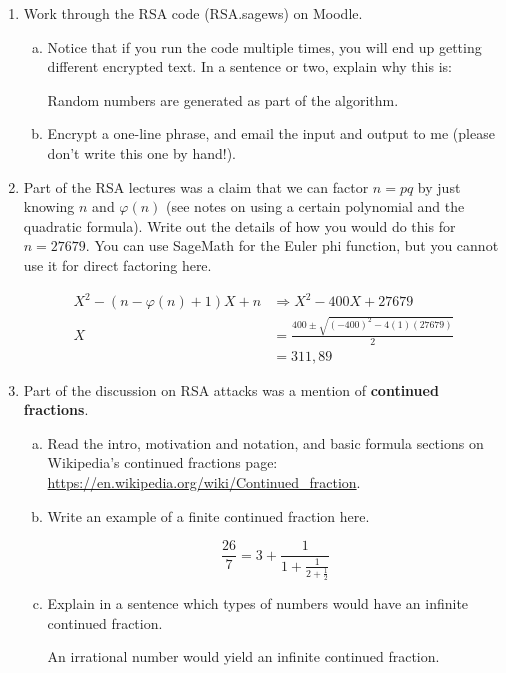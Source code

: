\documentclass[12pt]{amsart}
\theoremstyle{plain}
\theoremstyle{definition}
\begin{document}
\begin{enumerate}[1.]
	\item Work through the RSA code (RSA.sagews) on Moodle.  
	\begin{enumerate}[a.]
		\item Notice that if you run the code multiple times, you will end up getting different encrypted text.  In a sentence or two, explain why this is:
		\begin{framed}
		Random numbers are generated as part of the algorithm.
		\end{framed}
		\item Encrypt a one-line phrase, and email the input and output to me (please don't write this one by hand!).
	\end{enumerate}
	 \item Part of the RSA lectures was a claim that we can factor $n = pq$ by just knowing $n$ and $\varphi(n)$ (see notes on using a certain polynomial and the quadratic formula).  Write out the details of how you would do this for $n = 27679$.  You can use SageMath for the Euler phi function, but you cannot use it for direct factoring here.
		\begin{framed}
		\begin{align*}
		X^2-(n-\varphi(n)+1)X+n &\Rightarrow X^2-400X+27679\\
		X &= \frac{400 \pm \sqrt{(-400)^2-4(1)(27679)}}{2}\\
		&= 311, 89
		\end{align*}
		\end{framed}
	\item Part of the discussion on RSA attacks was a mention of \textbf{continued fractions}.
		\begin{enumerate}[a.]
			\item Read the intro, motivation and notation, and basic formula sections on Wikipedia's continued fractions page: \url{https://en.wikipedia.org/wiki/Continued_fraction}.\\
			\item Write an example of a finite continued fraction here.\\
				\begin{framed}
				$$\frac{26}{7} = 3+\frac{1}{1+\frac{1}{2+\frac{1}{2}}}$$
				\end{framed}
			\item Explain in a sentence which types of numbers would have an infinite continued fraction.
				\begin{framed}
				An irrational number would yield an infinite continued fraction.
				\end{framed}
		\end{enumerate}
\end{enumerate}

	
\end{document}
